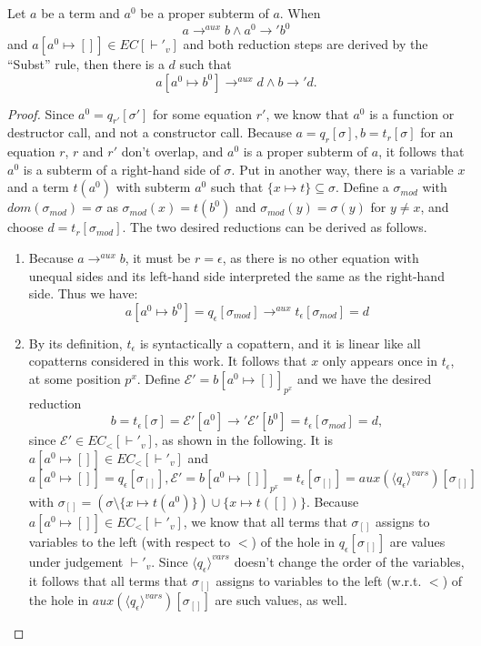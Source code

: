 \begin{lemma}
\label{lem:app2}
Let $a$ be a term and $a^0$ be a proper subterm of $a$. When
\[
a \longrightarrow^{aux} b \land a^0 \longrightarrow' b^0
\]
and $a[a^0 \mapsto []] \in EC[\vdash'_v]$ and both reduction steps are derived by the ``Subst'' rule, then there is a $d$ such that
\[
a[a^0 \mapsto b^0] \longrightarrow^{aux} d \land b \longrightarrow' d.
\]

\begin{proof}
Since $a^0 = q_{r'}[\sigma']$ for some equation $r'$, we know that $a^0$ is a function or destructor call, and not a constructor call. Because $a = q_r[\sigma], b = t_r[\sigma]$ for an equation $r$, $r$ and $r'$ don't overlap, and $a^0$ is a proper subterm of $a$, it follows that $a^0$ is a subterm of a right-hand side of $\sigma$. Put in another way, there is a variable $x$ and a term $t(a^0)$ with subterm $a^0$ such that $\{x \mapsto t\} \subseteq \sigma$. Define a $\sigma_{mod}$ with $dom(\sigma_{mod}) = \sigma$ as $\sigma_{mod}(x) = t(b^0)$ and $\sigma_{mod}(y) = \sigma(y)$ for $y \neq x$, and choose $d = t_r[\sigma_{mod}]$. The two desired reductions can be derived as follows.
\begin{enumerate}
\item Because $a \longrightarrow^{aux} b$, it must be $r = \epsilon$, as there is no other equation with unequal sides and its left-hand side interpreted the same as the right-hand side. Thus we have:
\[
a[a^0 \mapsto b^0] = q_\epsilon[\sigma_{mod}] \longrightarrow^{aux} t_\epsilon[\sigma_{mod}] = d
\]

\item By its definition, $t_\epsilon$ is syntactically a copattern, and it is linear like all copatterns considered in this work. It follows that $x$ only appears once in $t_\epsilon$, at some position $p^x$. Define $\mathcal{E}' = b[a^0 \mapsto []]_{p^x}$ and we have the desired reduction
\[
b = t_\epsilon[\sigma] = \mathcal{E}'[a^0] \longrightarrow' \mathcal{E}'[b^0] = t_\epsilon[\sigma_{mod}] = d,
\]
since $\mathcal{E}' \in EC_<[\vdash'_v]$, as shown in the following. It is $a[a^0 \mapsto []] \in EC_<[\vdash'_v]$ and
\[
a[a^0 \mapsto []] = q_\epsilon[\sigma_{[]}], \mathcal{E}' = b[a^0 \mapsto []]_{p^x} = t_\epsilon[\sigma_{[]}] = aux(\langle q_\epsilon \rangle^{vars})[\sigma_{[]}]
\]
with $\sigma_{[]} = (\sigma \setminus \{x \mapsto t(a^0)\}) \cup \{x \mapsto t([])\}$. Because $a[a^0 \mapsto []] \in EC_<[\vdash'_v]$, we know that all terms that $\sigma_{[]}$ assigns to variables to the left (with respect to $<$) of the hole in $q_\epsilon[\sigma_{[]}]$ are values under judgement $\vdash'_v$. Since $\langle q_\epsilon \rangle^{vars}$ doesn't change the order of the variables, it follows that all terms that $\sigma_{[]}$ assigns to variables to the left (w.r.t. $<$) of the hole in $aux(\langle q_\epsilon \rangle^{vars})[\sigma_{[]}]$ are such values, as well.

\end{enumerate}
\end{proof}
\end{lemma}

